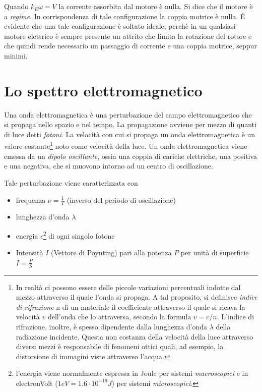 \documentclass[17pt]{extarticle}
\begin{document}
Quando $k_E\omega = V$ la corrente assorbita dal motore è nulla. Si dice che il motore è a \emph{regime}. In corrispondenza di tale configurazione la coppia motrice è nulla. \'E evidente che una tale configurazione è soltato ideale, perchè in un qualsiasi motore elettrico è sempre presente un attrito che limita la rotazione del rotore e che quindi rende necessario un passaggio di corrente e una coppia motrice, seppur minimi.



\clearpage

\section{Lo spettro elettromagnetico}\label{cap:elettromagnetiche}

Una onda elettromagnetica è una perturbazione del campo elettromagnetico che si propaga nello spazio e nel tempo. La propagazione avviene per mezzo di quanti di luce detti \emph{fotoni}. La velocità con cui si propaga un onda elettromagnetica è un valore costante\footnote{In realtà ci possono essere delle piccole variazioni percentuali indotte dal mezzo attraverso il quale l'onda si propaga. A tal proposito, si definisce \emph{indice di rifrazione} n di un materiale il coefficiente attraverso il quale si ricava la velocità $v$ dell'onda che lo attraversa, secondo la formula $v=c/n$. L'indice di rifrazione, inoltre, è spesso dipendente dalla lunghezza d'onda $\lambda$ della radiazione incidente. Questa non costanza della velocità della luce attraverso diversi mezzi è responsabile di fenomeni ottici quali, ad esempio, la distorsione di immagini viste attraverso l'acqua.} noto come velocità della luce. Un onda elettromagnetica viene emessa da un \emph{dipolo oscillante}, ossia una coppia di cariche elettriche, una positiva e una negativa, che si muovono intorno ad un centro di oscillazione. 

Tale perturbazione viene caratterizzata con

\begin{itemize}
	\item frequenza $\nu = \frac{1}{T}$ (inverso del periodo di oscillazione)
	\item lunghezza d'onda $\lambda$
	\item energia $\epsilon$\footnote{l'energia viene normalmente espressa in Joule per sistemi \emph{macroscopici} e in electronVolt ($1eV = 1.6\cdot 10^{-19}J$) per sistemi \emph{microscopici}.} di ogni singolo fotone
	\item Intensità $I$ (Vettore di Poynting) pari alla potenza $P$ per unità di superficie $I = \frac{P}{S}$
\end{itemize}
\end{document}
